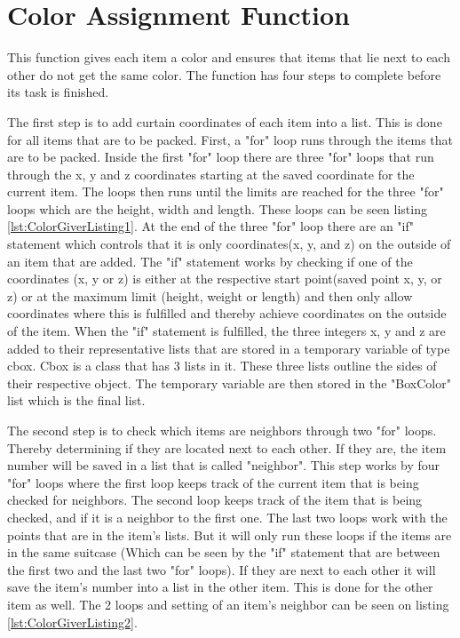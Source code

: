 \section{Color Assignment Function}
\label{sec:ColorGiver}
This function gives each item a color and ensures that items that lie next to each other do not get the same color. The function has four steps to complete before its task is finished.

The first step is to add curtain coordinates of each item into a list. This is done for all items that are to be packed. First, a "for" loop runs through the items that are to be packed. Inside the first "for" loop there are three "for" loops that run through the x, y and z coordinates starting at the saved coordinate for the current item. The loops then runs until the limits are reached for the three "for" loops which are the height, width and length. These loops can be seen listing \ref{lst:ColorGiverListing1}. At the end of the three "for" loop there are an "if" statement which controls that it is only coordinates(x, y, and z) on the outside of an item that are added. The "if" statement works by checking if one of the coordinates (x, y or z) is either at the respective start point(saved point x, y, or z) or at the maximum limit (height, weight or length) and then only allow coordinates where this is fulfilled and thereby achieve coordinates on the outside of the item.
When the "if" statement is fulfilled, the three integers x, y and z are added to their representative lists that are stored in a temporary variable of type cbox. Cbox is a class that has 3 lists in it. These three lists outline the sides of their respective object. The temporary variable are then stored in the "BoxColor" list which is the final list.

The second step is to check which items are neighbors through two "for" loops. Thereby determining if they are located next to each other. If they are, the item number will be saved in a list that is called "neighbor". This step works by four "for" loops where the first loop keeps track of the current item that is being checked for neighbors. The second loop keeps track of the item that is being checked, and if it is a neighbor to the first one. The last two loops work with the points that are in the item's lists. But it will only run these loops if the items are in the same suitcase (Which can be seen by the "if" statement that are between the first two and the last two "for" loops). If they are next to each other it will save the item's number into a list in the other item. This is done for the other item as well. The 2 loops and setting of an item's neighbor can be seen on listing \ref{lst:ColorGiverListing2}.

